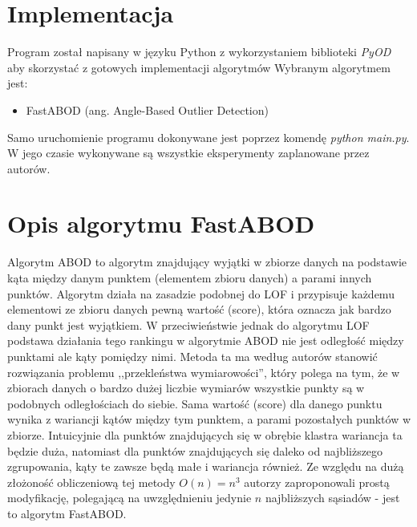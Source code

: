 \documentclass{classrep}
\begin{document}
    \section{Implementacja} {
        Program został napisany w języku Python z wykorzystaniem biblioteki
        \textit{PyOD}\cite{pyod} aby skorzystać z gotowych implementacji algorytmów
        Wybranym algorytmem jest:
        \begin{itemize}
            \item FastABOD (ang. Angle-Based Outlier Detection)
        \end{itemize}

        Samo uruchomienie programu dokonywane jest poprzez komendę
        \textit{python main.py}. W jego czasie wykonywane są wszystkie eksperymenty
        zaplanowane przez autorów.
    }

    \section{Opis algorytmu FastABOD} {
        Algorytm ABOD to algorytm znajdujący wyjątki w zbiorze danych na
        podstawie kąta między danym punktem (elementem zbioru danych) a
        parami innych punktów. Algorytm działa na zasadzie podobnej do LOF
        i przypisuje każdemu elementowi ze zbioru danych pewną wartość
        (score), która oznacza jak bardzo dany punkt jest wyjątkiem. W
        przeciwieństwie jednak do algorytmu LOF podstawa działania tego
        rankingu w algorytmie ABOD nie jest odległość między punktami ale
        kąty pomiędzy nimi. Metoda ta ma według autorów stanowić
        rozwiązania problemu ,,przekleństwa wymiarowości'', który polega na
        tym, że w zbiorach danych o bardzo dużej liczbie wymiarów wszystkie
        punkty są w podobnych odległościach do siebie. Sama wartość (score)
        dla danego punktu wynika z wariancji kątów między tym punktem, a
        parami pozostałych punktów w zbiorze. Intuicyjnie dla punktów
        znajdujących się w obrębie klastra wariancja ta będzie duża,
        natomiast dla punktów znajdujących się daleko od najbliższego
        zgrupowania, kąty te zawsze będą małe i wariancja również. Ze
        względu na dużą złożoność obliczeniową tej metody $O(n)=n^3$
        autorzy zaproponowali prostą modyfikację, polegającą na
        uwzględnieniu jedynie $n$ najbliższych sąsiadów - jest to algorytm
        FastABOD.
    }
\end{document}
